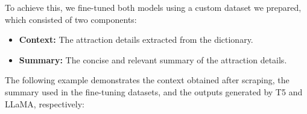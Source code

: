 \documentclass[manuscript,review,anonymous]{acmart}
\begin{document}
        To achieve this, we fine-tuned both models using a custom dataset we prepared, which consisted of two components:
        
        \vspace{-7pt}
        
        \begin{itemize}
          \item \textbf{Context:} The attraction details extracted from the dictionary.
          \item \textbf{Summary:} The concise and relevant summary of the attraction details.
        \end{itemize}
        
        The following example demonstrates the context obtained after scraping, the summary used in the fine-tuning datasets, and the outputs generated by T5 and LLaMA, respectively:
    
\end{document}
